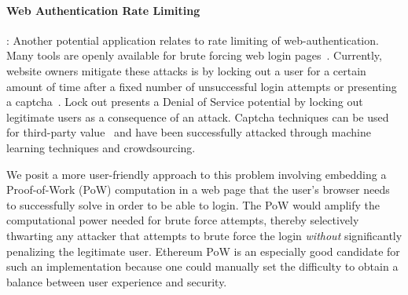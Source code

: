 \documentclass[runningheads]{llncs}
\newcommand{\trishita}[1]{}%
\begin{document}
\paragraph{\textbf{Web Authentication Rate Limiting}}:
Another potential application relates to rate limiting of web-authentication.  Many tools are openly available for brute forcing web login pages~\cite{hydra,burpsuite}. Currently, website owners mitigate these attacks is by locking out a user for a certain amount of time after a fixed number of unsuccessful login attempts or presenting a captcha~\cite{recaptcha}.  
Lock out presents a Denial of Service potential by locking out legitimate users as a consequence of an attack. 
Captcha techniques can be used for third-party value~\cite{von2008recaptcha} and have been successfully attacked through machine learning techniques and crowdsourcing.~\trishita{CITEEE...}%

We posit a more user-friendly approach to this problem involving embedding a Proof-of-Work (PoW) computation in a web page that the user's browser needs to successfully solve in order to be able to login. The PoW would amplify the computational power needed for brute force attempts, thereby selectively thwarting any attacker that attempts to brute force the login \emph{without} significantly penalizing the legitimate user. Ethereum PoW is an especially good candidate for such an implementation because one could manually set the difficulty to obtain a balance between user experience and security.
\end{document}
